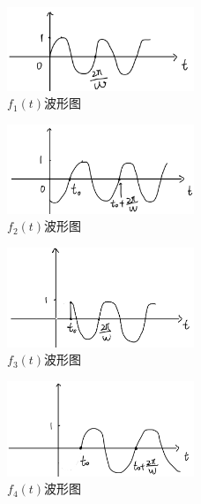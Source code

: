 \documentclass[answers]{exam}  %
\begin{document}
\begin{questions}
\begin{figure}
	\centering
	\includegraphics[width=0.5\textwidth]{pics/q2-1.png}
	\caption{$f_1(t)$波形图} \label{fig:q2-1}
\end{figure}
\begin{figure}
	\centering
	\includegraphics[width=0.5\textwidth]{pics/q2-2.png}
	\caption{$f_2(t)$波形图} \label{fig:q2-2}
\end{figure}
\begin{figure}
	\centering
	\includegraphics[width=0.5\textwidth]{pics/q2-3.png}
	\caption{$f_3(t)$波形图} \label{fig:q2-3}
\end{figure}
\begin{figure}
	\centering
	\includegraphics[width=0.5\textwidth]{pics/q2-4.png}
	\caption{$f_4(t)$波形图} \label{fig:q2-4}
\end{figure}


\end{questions}
\end{document}
